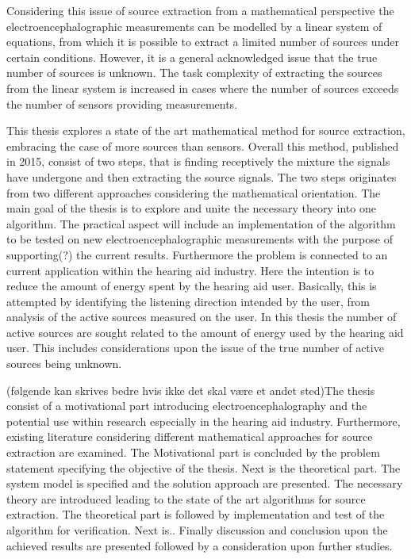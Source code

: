 Considering this issue of source extraction from a mathematical perspective the electroencephalographic measurements can be modelled by a linear system of equations, from which it is possible to extract a limited number of sources under certain conditions. However, it is a general acknowledged issue that the true number of sources is unknown.
The task complexity of extracting the sources from the linear system is increased in cases where the number of sources exceeds the number of sensors providing measurements.

This thesis explores a state of the art mathematical method for source extraction, embracing the case of more sources than sensors. Overall this method, published in 2015, consist of two steps, that is finding receptively the mixture the signals have undergone and then extracting the source signals. The two steps originates from two different approaches considering the mathematical orientation. 
The main goal of the thesis is to explore and unite the necessary theory into one algorithm. The practical aspect will include an implementation of the algorithm to be tested on new electroencephalographic measurements with the purpose of supporting(?) the current results. Furthermore the problem is connected to an current application within the hearing aid industry. Here the intention is to reduce the amount of energy spent by the hearing aid user. Basically, this is attempted by identifying the listening direction intended by the user, from analysis of the active sources measured on the user.
In this thesis the number of active sources are sought related to the amount of energy used by the hearing aid user.   
This includes considerations upon the issue of the true number of active sources being unknown. 

(følgende kan skrives bedre hvis ikke det skal være et andet sted)The thesis consist of a motivational part introducing  electroencephalography and the potential use within research especially in the hearing aid industry. Furthermore, existing literature considering different mathematical approaches for source extraction are examined. The Motivational part is concluded by the problem statement specifying the objective of the thesis.
Next is the theoretical part. The system model is specified and the solution approach are presented. The necessary theory are introduced leading to the state of the art algorithms for source extraction.   
The theoretical part is followed by implementation and test of the algorithm for verification. 
Next is..
Finally discussion and conclusion upon the achieved results are presented followed by a consideration upon further studies.    
       
      





              

